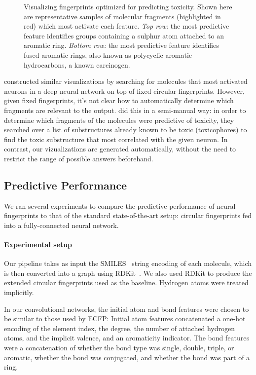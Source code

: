 \documentclass{article}
\begin{document}
\begin{figure}[h]
\begin{tabular}{>{\centering}m{1in} >{\centering}m{3.1cm} >{\centering}m{3.3cm} >{\centering\arraybackslash}m{3.1cm}}
\end{tabular}
\vspace{-3mm}
\caption{Visualizing fingerprints optimized for predicting toxicity.
Shown here are representative samples of molecular fragments (highlighted in red) which most activate each feature.
\emph{Top row:} the most predictive feature identifies groups containing a sulphur atom attached to an aromatic ring.
\emph{Bottom row:} the most predictive feature identifies fused aromatic rings, also known as polycyclic aromatic hydrocarbons, a known carcinogen.
}
\label{fig:learned features toxicity}
\end{figure}

\citet{unterthiner2015toxicity} constructed similar visualizations by searching for molecules that most activated neurons in a deep neural network on top of fixed circular fingerprints.
However, given fixed fingerprints, it's not clear how to automatically determine which fragments are relevant to the output.
\citet{unterthiner2015toxicity} did this in a semi-manual way: in order to determine which fragments of the molecules were predictive of toxicity, they searched over a list of substructures already known to be toxic (toxicophores) to find the toxic substructure that most correlated with the given neuron.
In contrast, our vizualizations are generated automatically, without the need to restrict the range of possible answers beforehand.

\subsection{Predictive Performance}

We ran several experiments to compare the predictive performance of neural fingerprints to that of the standard state-of-the-art setup:  circular fingerprints fed into a fully-connected neural network.

\paragraph{Experimental setup}
Our pipeline takes as input the SMILES~\citep{weininger1988smiles} string encoding of each molecule, which is then converted into a graph using RDKit~\citep{rdkit}.
We also used RDKit to produce the extended circular fingerprints used as the baseline.
Hydrogen atoms were treated implicitly.

In our convolutional networks, the initial atom and bond features were chosen to be similar to those used by ECFP:
Initial atom features concatenated a one-hot encoding of the element index, the degree, the number of attached hydrogen atoms, and the implicit valence, and an aromaticity indicator.
The bond features were a concatenation of whether the bond type was single, double, triple, or aromatic, whether the bond was conjugated, and whether the bond was part of a ring.
\end{document}
